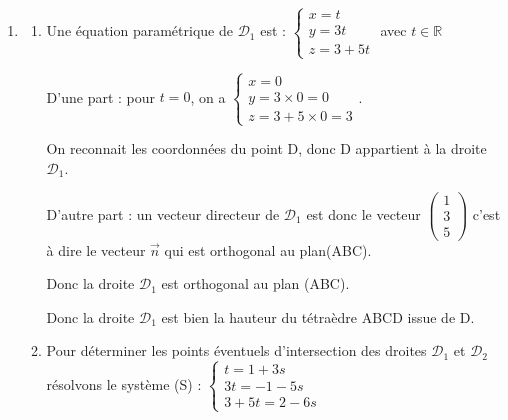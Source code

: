 \documentclass[10pt]{article}
\providecommand{\R}{\mathbb{R}}
\providecommand{\vect}[1]{\overrightarrow{#1}}
\begin{document}
\begin{enumerate}
\begin{enumerate}
$-2 +3\times 0 + 5\times 2 +d=0 \Longleftrightarrow -2+10+d=0 \Longleftrightarrow d=-8$

Une équation cartésienne du plan (ABC) est donc	$x+3 y+5 z-8=0$.

		\item  $x_D+3 y_D+5 z_D-8=0+3\times 0 +5\times 3 -8=15-8=7\neq 0 $

Donc le point D n'appartient pas au plan (ABC) d'où  les points A, B, C et D ne sont pas coplanaires.
		\end{enumerate}

	\item

		\begin{enumerate}
			\item  Une équation paramétrique de $\mathcal{D}_{1}$ est :  $\begin{cases} x=t \\ y=3 t \\ z=3+5 t  \end{cases} $ avec $t \in \R$

D'une part : pour $t=0$, on a $\begin{cases} x=0 \\ y=3 \times0 =0  \\ z=3+5 \times 0 =3  \end{cases} $.

			On reconnait les coordonnées du point D, donc D appartient à la droite $\mathcal{D}_{1}$.

D'autre part : un vecteur directeur de $\mathcal{D}_{1}$ est donc le vecteur $\begin{pmatrix}	1\\ 3 \\ 5 \end{pmatrix}$ c'est à dire le vecteur $\vect{n}$ qui est orthogonal au plan(ABC).

Donc la droite $\mathcal{D}_{1}$ est orthogonal au plan (ABC).


Donc  la droite $\mathcal{D}_{1}$ est bien la hauteur du tétraèdre ABCD issue de D.

		\item  Pour déterminer les points éventuels d'intersection des droites $\mathcal{D}_{1}$ et $\mathcal{D}_{2}$  résolvons le système (S) :  $\begin{cases} t=1+3s \\ 3 t=-1-5s \\ 3+5 t=2-6s  \end{cases} $


\end{enumerate}
\end{enumerate}
\end{document}
